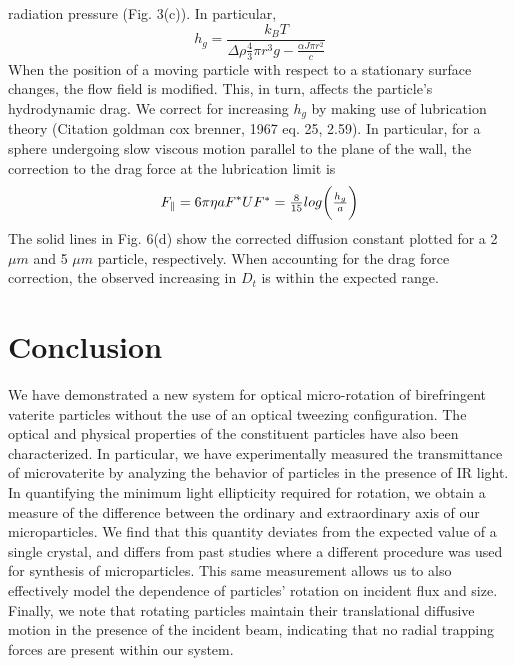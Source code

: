 \documentclass[12pt]{article}
\begin{document}
{radiation pressure (Fig. 3(c)). In particular, 
\begin{equation}
h_{g}=\frac{k_{B}T}{\Delta\rho\frac{4}{3}\pi r^{3}g-\frac{\alpha J\pi r^{2}}{c}}
\end{equation}
When the position of a moving particle with respect to a stationary surface changes, the flow field  is modified. This, in turn,  affects the particle's hydrodynamic drag. We correct for increasing $h_{g}$ by making use of  lubrication theory  (Citation goldman cox brenner, 1967 eq. 25, 2.59). In particular, for a sphere undergoing slow viscous motion parallel to the plane of the wall, the correction to the drag force at the lubrication limit is 
\begin{equation}
F_{\parallel}=6\pi\eta aF^{*}U$$
$$F^{*}=\frac{8}{15}log\bigg(\frac{h_g}{a}\bigg)
\end{equation}
The solid lines in Fig. 6(d) show the corrected diffusion constant plotted for a 2$\mu m$ and 5 $\mu m$ particle, respectively. When accounting for the drag force correction, the observed increasing in $D_{t}$ is within the expected range.

\section*{Conclusion}
We have demonstrated a new system for optical micro-rotation of birefringent vaterite particles without the use of an optical tweezing configuration. The optical and physical properties of the constituent particles have also been characterized. In particular, we have experimentally measured the transmittance of microvaterite by analyzing the behavior of particles in the presence of IR light. In quantifying the minimum light ellipticity required for rotation, we obtain a measure of the difference between the ordinary and extraordinary axis of our microparticles. We find that this quantity deviates from the expected value of a single crystal, and differs from past studies where a different procedure was used for synthesis of microparticles. This same measurement allows us to also effectively model the dependence of particles' rotation on incident flux and size. Finally, we note that rotating particles maintain their translational diffusive motion in the presence of the incident beam, indicating that no radial trapping forces are present within our system.








}
\end{document}
